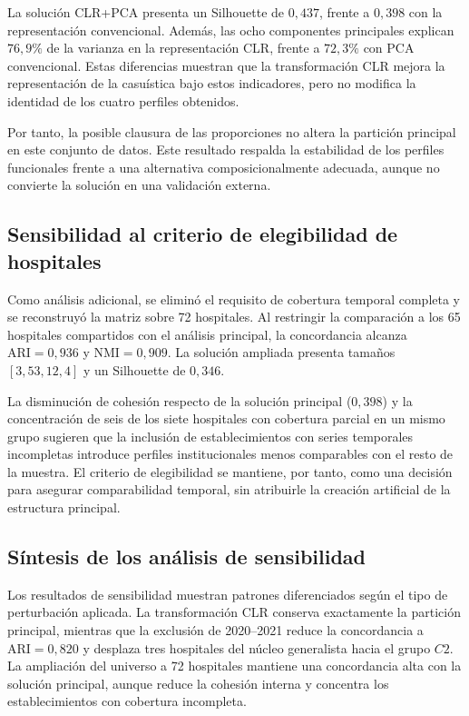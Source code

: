 La solución CLR+PCA presenta un Silhouette de $0{,}437$, frente a $0{,}398$ con la representación convencional. Además, las ocho componentes principales explican $76{,}9\%$ de la varianza en la representación CLR, frente a $72{,}3\%$ con PCA convencional. Estas diferencias muestran que la transformación CLR mejora la representación de la casuística bajo estos indicadores, pero no modifica la identidad de los cuatro perfiles obtenidos.

Por tanto, la posible clausura de las proporciones no altera la partición principal en este conjunto de datos. Este resultado respalda la estabilidad de los perfiles funcionales frente a una alternativa composicionalmente adecuada, aunque no convierte la solución en una validación externa.

\subsection*{Sensibilidad al criterio de elegibilidad de hospitales}

Como análisis adicional, se eliminó el requisito de cobertura temporal completa y se reconstruyó la matriz sobre 72 hospitales. Al restringir la comparación a los 65 hospitales compartidos con el análisis principal, la concordancia alcanza $\text{ARI}=0{,}936$ y $\text{NMI}=0{,}909$. La solución ampliada presenta tamaños $[3,53,12,4]$ y un Silhouette de $0{,}346$.

La disminución de cohesión respecto de la solución principal ($0{,}398$) y la concentración de seis de los siete hospitales con cobertura parcial en un mismo grupo sugieren que la inclusión de establecimientos con series temporales incompletas introduce perfiles institucionales menos comparables con el resto de la muestra. El criterio de elegibilidad se mantiene, por tanto, como una decisión para asegurar comparabilidad temporal, sin atribuirle la creación artificial de la estructura principal.

\subsection*{Síntesis de los análisis de sensibilidad}

Los resultados de sensibilidad muestran patrones diferenciados según el tipo de perturbación aplicada. La transformación CLR conserva exactamente la partición principal, mientras que la exclusión de 2020--2021 reduce la concordancia a $\text{ARI}=0{,}820$ y desplaza tres hospitales del núcleo generalista hacia el grupo $C2$. La ampliación del universo a 72 hospitales mantiene una concordancia alta con la solución principal, aunque reduce la cohesión interna y concentra los establecimientos con cobertura incompleta.

